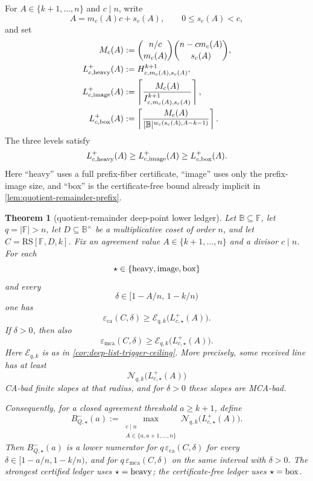 \documentclass[11pt]{article}
\newtheorem{theorem}{Theorem}[section]
\theoremstyle{definition}
\theoremstyle{remark}
\newcommand{\F}{\mathbb{F}}
\newcommand{\B}{\mathbb{B}}
\newcommand{\RS}{\mathrm{RS}}
\newcommand{\eca}{\varepsilon_{\mathrm{ca}}}
\newcommand{\emca}{\varepsilon_{\mathrm{mca}}}
\begin{document}
For $A\in\{k+1,
\ldots,n\}$ and $c\mid n$, write
\[
        A=m_c(A)c+s_c(A),
        \qquad 0\le s_c(A)<c,
\]
and set
\[
\begin{aligned}
        M_c(A)&:=
        \binom{n/c}{m_c(A)}
        \binom{n-cm_c(A)}{s_c(A)},\\
        L_{c,{\rm heavy}}^+(A)&:=
        H_{c,m_c(A),s_c(A)}^{k+1},\\
        L_{c,{\rm image}}^+(A)&:=
        \left\lceil\frac{M_c(A)}{I_{c,m_c(A),s_c(A)}^{k+1}}\right\rceil,\\
        L_{c,{\rm box}}^+(A)&:=
        \left\lceil
        \frac{M_c(A)}{|\B|^{w_c(s_c(A),A-k-1)}}
        \right\rceil .
\end{aligned}
\]
The three levels satisfy
\[
        L_{c,{\rm heavy}}^+(A)
        \ge L_{c,{\rm image}}^+(A)
        \ge L_{c,{\rm box}}^+(A).
\]
Here ``heavy'' uses a full prefix-fiber certificate, ``image'' uses only the
prefix-image size, and ``box'' is the certificate-free bound already implicit in
\cref{lem:quotient-remainder-prefix}.

\begin{theorem}[quotient-remainder deep-point lower ledger]
\label{thm:quotient-remainder-deep-floor}
Let $\B\subseteq\F$, let $q=|\F|>n$, let
$D\subseteq\B^\times$ be a multiplicative coset of order $n$, and let
$C=\RS[\F,D,k]$.  Fix an agreement value $A\in\{k+1,\ldots,n\}$ and a
divisor $c\mid n$.  For each
\[
        \star\in\{{\rm heavy},{\rm image},{\rm box}\}
\]
and every
\[
        \delta\in[1-A/n,\,1-k/n)
\]
one has
\[
        \eca(C,\delta)
        \ge \mathcal E_{q,k}\bigl(L_{c,\star}^+(A)\bigr).
\]
If $\delta>0$, then also
\[
        \emca(C,\delta)
        \ge \mathcal E_{q,k}\bigl(L_{c,\star}^+(A)\bigr).
\]
Here $\mathcal E_{q,k}$ is as in \cref{cor:deep-list-trigger-ceiling}.  More
precisely, some received line has at least
\[
        \mathcal N_{q,k}\bigl(L_{c,\star}^+(A)\bigr)
\]
CA-bad finite slopes at that radius, and for $\delta>0$ these slopes are
MCA-bad.

Consequently, for a closed agreement threshold $a\ge k+1$, define
\[
        B_{Q,\star}^-(a)
        :=\max_{\substack{c\mid n\\ A\in\{a,a+1,\ldots,n\}}}
          \mathcal N_{q,k}\bigl(L_{c,\star}^+(A)\bigr).
\]
Then $B_{Q,\star}^-(a)$ is a lower numerator for $q\,\eca(C,\delta)$ for
every $\delta\in[1-a/n,1-k/n)$, and for $q\,\emca(C,\delta)$ on the
same interval with $\delta>0$.  The strongest
certified ledger uses $\star={\rm heavy}$; the certificate-free ledger uses
$\star={\rm box}$.
\end{theorem}
\end{document}
